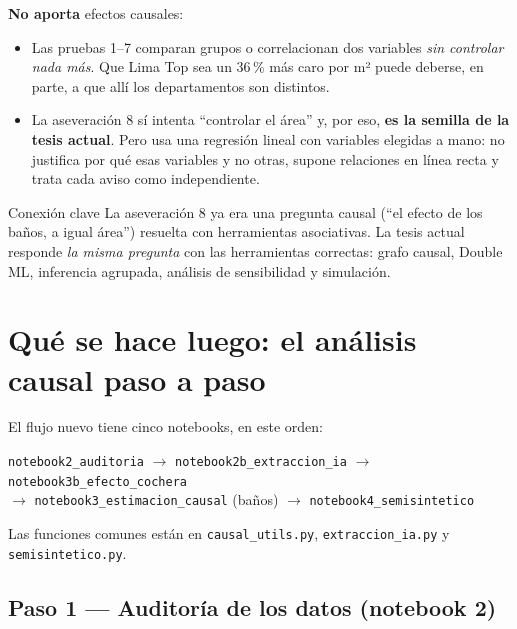 \documentclass[11pt,a4paper]{article}
\begin{document}
\textbf{No aporta} efectos causales:
\begin{itemize}
\item Las pruebas 1--7 comparan grupos o correlacionan dos variables \emph{sin controlar nada más}. Que Lima Top sea un 36\,\% más caro por m² puede deberse, en parte, a que allí los departamentos son distintos.
\item La aseveración 8 sí intenta ``controlar el área'' y, por eso, \textbf{es la semilla de la tesis actual}. Pero usa una regresión lineal con variables elegidas a mano: no justifica por qué esas variables y no otras, supone relaciones en línea recta y trata cada aviso como independiente.
\end{itemize}

\begin{idea}{Conexión clave}
La aseveración 8 ya era una pregunta causal (``el efecto de los baños, a igual área'') resuelta con herramientas asociativas. La tesis actual responde \emph{la misma pregunta} con las herramientas correctas: grafo causal, Double ML, inferencia agrupada, análisis de sensibilidad y simulación.
\end{idea}

\section{Qué se hace luego: el análisis causal paso a paso}

El flujo nuevo tiene cinco notebooks, en este orden:

\begin{center}\small
\texttt{notebook2\_auditoria} $\rightarrow$ \texttt{notebook2b\_extraccion\_ia} $\rightarrow$ \texttt{notebook3b\_efecto\_cochera}\\
$\rightarrow$ \texttt{notebook3\_estimacion\_causal} (baños) $\rightarrow$ \texttt{notebook4\_semisintetico}
\end{center}

Las funciones comunes están en \texttt{causal\_utils.py}, \texttt{extraccion\_ia.py} y \texttt{semisintetico.py}.

\subsection{Paso 1 --- Auditoría de los datos (notebook 2)}
\end{document}
